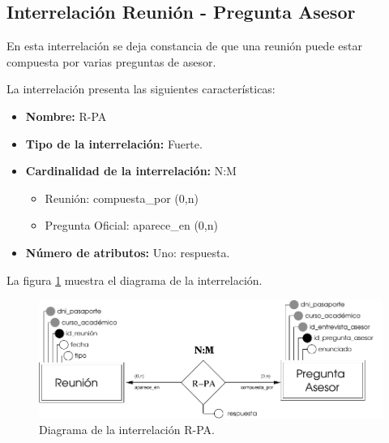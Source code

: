 \subsection{Interrelación Reunión - Pregunta Asesor}

   \begin{description}
      \item[Definición] En esta interrelación se deja constancia de que una
      reunión puede estar compuesta por varias preguntas de asesor.

      \item[Características] La interrelación presenta las siguientes
                             características:

         \begin{itemize}
            \item \textbf{Nombre:} R-PA
            \item \textbf{Tipo de la interrelación:} Fuerte.
            \item \textbf{Cardinalidad de la interrelación:} N:M
                  \begin{itemize}
                     \item Reunión: compuesta\_por (0,n)
                     \item Pregunta Oficial: aparece\_en (0,n)
                  \end{itemize}
            \item \textbf{Número de atributos:} Uno: respuesta.
         \end{itemize}

      \item[Diagrama] La figura \ref{diagramaR-PA} muestra el diagrama de la
                      interrelación.

      \item \begin{figure}[!ht]
            \begin{center}
            \includegraphics[]{07.Modelo_Entidad-Interrelacion/7.3.Analisis_Interrelaciones/diagramas/R-PA.pdf}
            \caption{Diagrama de la interrelación R-PA.}
            \label{diagramaR-PA}
            \end{center}
         \end{figure}


\end{description}

